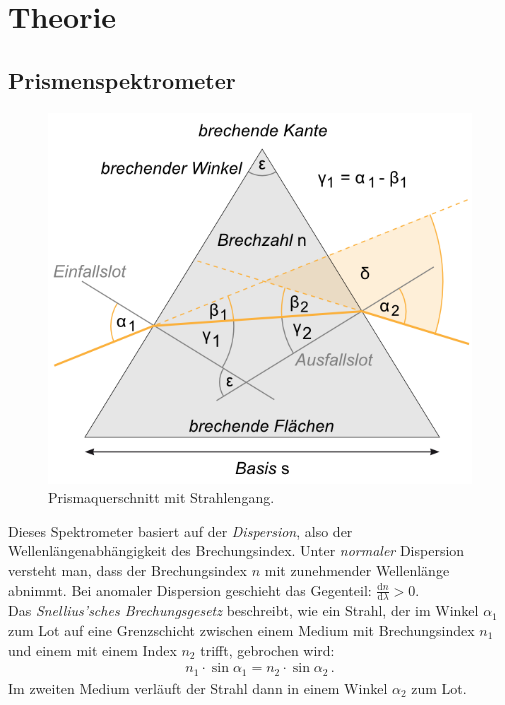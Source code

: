 \documentclass[12pt,a4paper,titlepage,headinclude,bibtotoc]{scrartcl}
\newcommand{\dif}{\ensuremath{\mathrm{d}}}
\begin{document}
\section{Theorie}
\label{sec:theorie}
\subsection{Prismenspektrometer}

\begin{figure}[!h]
	\centering
	\includegraphics[scale=0.6]{Prisma.png}
	\caption{Prismaquerschnitt mit Strahlengang. \cite[Datum: 28.12.2014]{LP19}}
	\label{fig:prisma}
\end{figure}
Dieses Spektrometer basiert auf der \textit{Dispersion}, also der Wellenlängenabhängigkeit des Brechungsindex.
Unter \textit{normaler} Dispersion versteht man, dass der Brechungsindex $n$ mit zunehmender Wellenlänge abnimmt.
Bei anomaler Dispersion geschieht das Gegenteil: $\frac{\dif n}{\dif \lambda} > 0$.\\

Das \emph{Snellius'sches Brechungsgesetz} beschreibt, wie ein Strahl, der im Winkel $\alpha_1$ zum Lot auf eine Grenzschicht zwischen einem Medium mit Brechungsindex $n_1$ und einem mit einem Index $n_2$ trifft, gebrochen wird:
\begin{align}
	n_1 \cdot \sin \alpha_1 = n_2 \cdot \sin \alpha_2 \,.
	\label{eq:Snellius} 
\end{align}
Im zweiten Medium verläuft der Strahl dann in einem Winkel $\alpha_2$ zum Lot.\\
\end{document}
